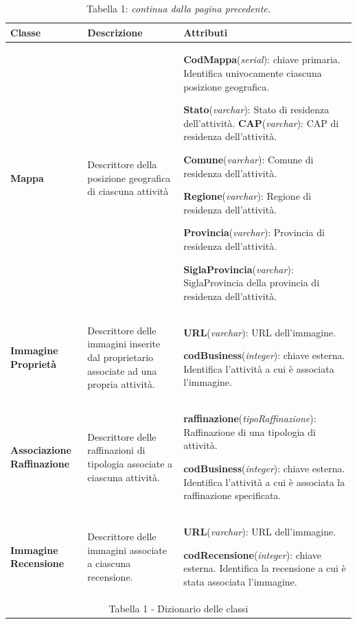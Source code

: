 \documentclass[a4paper,12pt]{article}
\begin{document}
\newpage\null{}\setcounter{page}{6}
\vspace{-2cm}
\begin{flushleft}
\begin{table}[htbp]
\caption*{Tabella 1: {\it continua dalla pagina precedente.}}
\begin{tabular}[c]{| m{3cm} | m{5cm} | m{7cm} |}
\hline
\bf Classe&\bf Descrizione&\bf Attributi\\
\hline
{\bf Mappa}
&\small Descrittore della posizione geografica di ciascuna attività
&\footnotesize
{\bf CodMappa}({\it serial}): chiave primaria. Identifica univocamente ciascuna posizione geografica.

{\bf Stato}({\it varchar}): Stato di residenza dell'attività.
{\bf CAP}({\it varchar}): CAP di residenza dell'attività.

{\bf Comune}({\it varchar}): Comune di residenza dell'attività.

{\bf Regione}({\it varchar}): Regione di residenza dell'attività.

{\bf Provincia}({\it varchar}): Provincia di residenza dell'attività.

{\bf SiglaProvincia}({\it varchar}): SiglaProvincia della provincia di residenza dell'attività.
\\
\hline

{\bf Immagine
Proprietà}
&\small Descrittore delle immagini inserite dal proprietario associate ad una propria
attività.
&\footnotesize
{\bf URL}({\it varchar}): URL dell'immagine.

{\bf codBusiness}({\it integer}): chiave esterna. Identifica l'attività a
cui è associata l'immagine.
\\
\hline

{\bf Associazione
Raffinazione}
&\small Descrittore delle raffinazioni di tipologia associate a ciascuna attività.
&\footnotesize
{\bf raffinazione}({\it tipoRaffinazione}): Raffinazione di una tipologia di attività.

{\bf codBusiness}({\it integer}): chiave esterna. Identifica l'attività a
cui è associata la raffinazione specificata.
\\
\hline

{\bf Immagine
Recensione}
&\small Descrittore delle immagini associate a ciascuna recensione.
&\footnotesize
{\bf URL}({\it varchar}): URL dell'immagine.

{\bf codRecensione}({\it integer}): chiave esterna. Identifica la recensione a 
cui è stata associata l'immagine.
\\
\hline
\multicolumn{3}{c}{\footnotesize{\normalsize Tabella 1 - Dizionario delle classi}}
\end{tabular}
\end{table}
\end{flushleft}
\newpage
\end{document}
